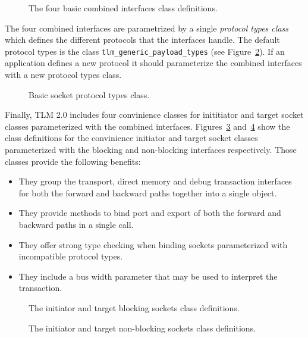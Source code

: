 {\begin{figure}[h]
	
	\caption{The four basic combined interfaces class definitions.}
	\label{fig:combined_interfaces}
\end{figure}

The four combined interfaces are parametrized by a single \emph{protocol types class} which defines the different protocols that the interfaces handle.
The default protocol types is the class \texttt{tlm\_generic\_payload\_types} (see Figure~\ref{fig:tlm_socket_types}).
If an application defines a new protocol it should parameterize the combined interfaces with a new protocol types class.

\begin{figure}[h]
	
	\caption{Basic socket protocol types class.}
	\label{fig:tlm_socket_types}
\end{figure}

Finally, TLM 2.0 includes four convinience classes for inititiator and target socket classes parameterized with the combined interfaces.
Figures~\ref{fig:tlm_socket_blocking} and~\ref{fig:tlm_socket_non_blocking} show the class definitions for the convinience initiator and target socket classes parameterized with the blocking and non-blocking interfaces respectively.
Those classes provide the following benefits:
\begin{itemize}
	\item They group the transport, direct memory and debug transaction interfaces for both the forward and backward paths together into a single object.
	\item They provide methods to bind port and export of both the forward and backward paths in a single call.
	\item They offer strong type checking when binding sockets parameterized with incompatible protocol types.
	\item They include a bus width parameter that may be used to interpret the transaction.
\end{itemize}

\begin{figure}[h]
	
	\caption{The initiator and target blocking sockets class definitions.}
	\label{fig:tlm_socket_blocking}
\end{figure}

\begin{figure}[h]
	
	\caption{The initiator and target non-blocking sockets class definitions.}
	\label{fig:tlm_socket_non_blocking}
\end{figure}

}

